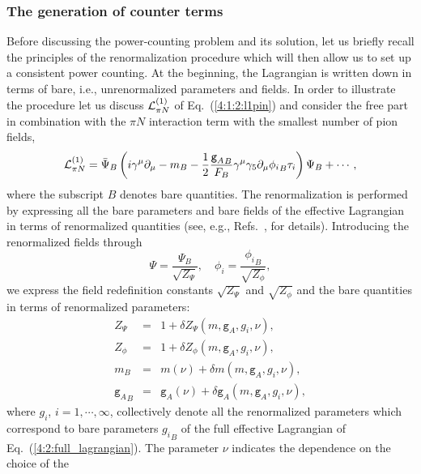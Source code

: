 \documentclass[twoside,12pt]{article}
\begin{document}
\subsubsection{\label{genct}The generation of counter terms}
   Before discussing the power-counting problem and its solution,
let us briefly recall the principles of the renormalization procedure which
will then allow us to set up a consistent power counting.
   At the beginning, the Lagrangian is written down in terms of bare, i.e.,
unrenormalized parameters and fields.
   In order to illustrate the procedure let us discuss
${\cal L}_{\pi N}^{(1)}$ of Eq.~(\ref{4:1:2:l1pin})
and consider the free part in combination with the $\pi N$
interaction term with the smallest number of pion fields,
\begin{equation}
{\cal L}_{\pi N}^{(1)}=\bar \Psi_B \left( i\gamma^\mu
\partial_\mu -m_B -\frac{1}{2}\frac{{\texttt{g}_A}_B}{F_B}
\gamma^\mu
\gamma_5 \partial_\mu {\phi_i}_B  \tau_i \right) \Psi_B +\cdots,
\label{4:2:1:pieceoflolagr}
\end{equation}
where the subscript $B$ denotes bare quantities.
   The renormalization is performed by expressing all the bare parameters and
bare fields of the effective Lagrangian in terms of renormalized quantities
(see, e.g., Refs.\ \cite{Collins:xc}, \cite{Weinberg:1995mt} for details).
   Introducing the renormalized fields through
\begin{equation}
\label{4:2:1:renf}
\Psi=\frac{\Psi_B}{\sqrt{Z_\Psi}},\quad
\phi_i=\frac{{\phi_i}_B}{\sqrt{Z_\phi}},
\end{equation}
we express the field redefinition constants $\sqrt{Z_\Psi}$ and
$\sqrt{Z_\phi}$
and the bare quantities in terms of renormalized parameters:
\begin{eqnarray}
Z_\Psi&=& 1+\delta Z_\Psi\left(m,\texttt{g}_A, g_i, \nu \right),\nonumber\\
Z_{\phi}&=&1+\delta Z_\phi\left(m,\texttt{g}_A, g_i, \nu \right),\nonumber \\
m_B &=&m(\nu)+\delta m\left(m,\texttt{g}_A, g_i, \nu \right),\nonumber \\
{\texttt{g}_A}_B&=&\texttt{g}_A(\nu)+\delta \texttt{g}_A\left(m,\texttt{g}_A, g_i, \nu \right),
\label{4:2:1:bare}
\end{eqnarray}
where $g_i$, $i=1,\cdots, \infty$, collectively denote all the
renormalized parameters which correspond to bare parameters
${g_i}_B$ of the full effective Lagrangian of Eq.~(\ref{4:2:full_lagrangian}).
   The parameter $\nu$ indicates the dependence on the choice of the
\end{document}
